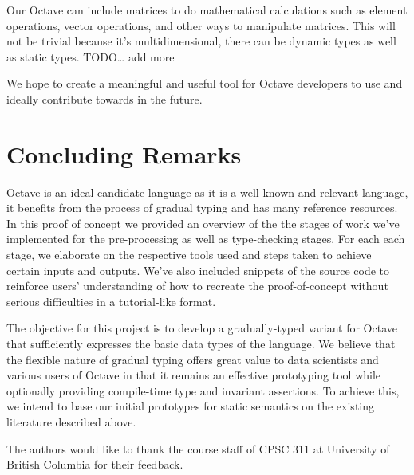 Our Octave can include matrices to do mathematical calculations such as element operations, vector operations, and other ways to manipulate matrices. This will not be trivial because it’s multidimensional, there can be dynamic types as well as static types.
TODO… add more

We hope to create a meaningful and useful tool for Octave developers to use and ideally contribute towards in the future.

\section{Concluding Remarks}
Octave is an ideal candidate language as it is a well-known and relevant language, it benefits from the process of gradual typing and has many reference resources. In this proof of concept we provided an overview of the the stages of work we’ve implemented for the pre-processing as well as type-checking stages. For each each stage, we elaborate on the respective tools used and steps taken to achieve certain inputs and outputs. We’ve also included snippets of the source code to reinforce users’ understanding of how to recreate the proof-of-concept without serious difficulties in a tutorial-like format.

The objective for this project is to develop a gradually-typed variant for Octave that sufficiently expresses the basic data types of the language. We believe that the flexible nature of gradual typing offers great value to data scientists and various users of Octave in that it remains an effective prototyping tool while optionally providing compile-time type and invariant assertions. To achieve this, we intend to base our initial prototypes for static semantics on the existing literature described above.

\appendix

\begin{acks}
    The authors would like to thank the course staff of CPSC 311 at University
    of British Columbia for their feedback.
\end{acks}